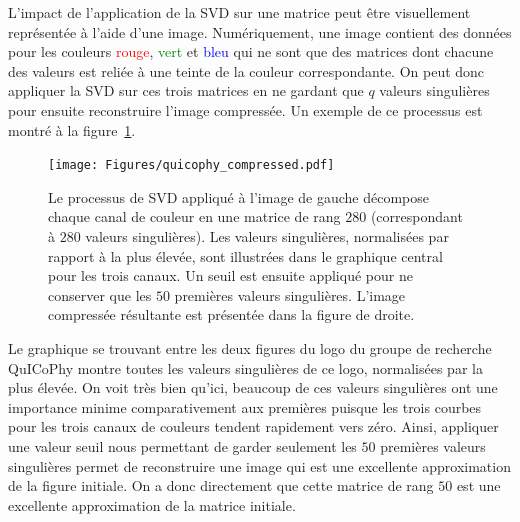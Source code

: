 L'impact de l'application de la SVD sur une matrice peut être visuellement représentée à l'aide d'une image.
Numériquement, une image contient des données pour les couleurs \textcolor{red}{rouge}, \textcolor{green}{vert} et \textcolor{blue}{bleu} qui ne sont que des matrices dont chacune des valeurs est reliée à une teinte de la couleur correspondante.
On peut donc appliquer la SVD sur ces trois matrices en ne gardant que $q$ valeurs singulières pour ensuite reconstruire l'image compressée.
Un exemple de ce processus est montré à la figure~\ref{fig:svd-on-figure}.
\begin{figure}[h]
    \centering
    \texttt{[image: Figures/quicophy\_compressed.pdf]}
    \caption[Le processus de SVD appliqué sur une image.]{Le processus de SVD appliqué à l'image de gauche décompose chaque canal de couleur en une matrice de rang $280$ (correspondant à $280$ valeurs singulières). Les valeurs singulières, normalisées par rapport à la plus élevée, sont illustrées dans le graphique central pour les trois canaux. Un seuil est ensuite appliqué pour ne conserver que les $50$ premières valeurs singulières. L'image compressée résultante est présentée dans la figure de droite.}
    \label{fig:svd-on-figure}
\end{figure}
Le graphique se trouvant entre les deux figures du logo du groupe de recherche QuICoPhy montre toutes les valeurs singulières de ce logo, normalisées par la plus élevée.
On voit très bien qu'ici, beaucoup de ces valeurs singulières ont une importance minime comparativement aux premières puisque les trois courbes pour les trois canaux de couleurs tendent rapidement vers zéro.
Ainsi, appliquer une valeur seuil nous permettant de garder seulement les $50$ premières valeurs singulières permet de reconstruire une image qui est une excellente approximation de la figure initiale.
On a donc directement que cette matrice de rang $50$ est une excellente approximation de la matrice initiale.

